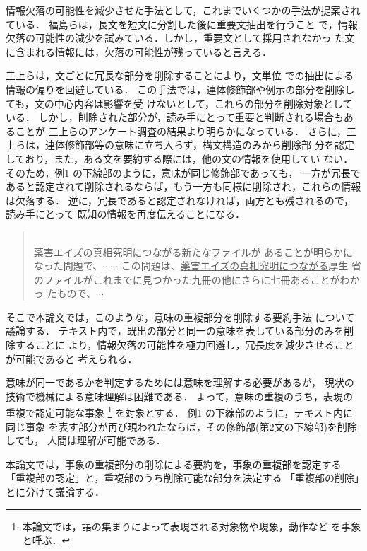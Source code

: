 情報欠落の可能性を減少させた手法として，これまでいくつかの手法が提案され
ている．
福島ら\cite{fukushima99}は，長文を短文に分割した後に重要文抽出を行うこと
で，情報欠落の可能性の減少を試みている．しかし，重要文として採用されなかっ
た文に含まれる情報には，欠落の可能性が残っていると言える．

三上ら\cite{mikami99}は，文ごとに冗長な部分を削除することにより，文単位
での抽出による情報の偏りを回避している．
この手法では，連体修飾部や例示の部分を削除しても，文の中心内容は影響を受
けないとして，これらの部分を削除対象としている．
しかし，削除された部分が，読み手にとって重要と判断される場合もあることが
三上らのアンケート調査の結果より明らかになっている．
さらに，三上らは，連体修飾部等の意味に立ち入らず，構文構造のみから削除部
分を認定しており，また，ある文を要約する際には，他の文の情報を使用してい
ない．
そのため，例1 の下線部のように，意味が同じ修飾部であっても，
一方が冗長で
あると認定されて削除されるならば，もう一方も同様に削除され，これらの情報
は欠落する．
逆に，冗長であると認定されなければ，両方とも残されるので，読み手にとって
既知の情報を再度伝えることになる．
\newpage
\begin{quote}\label{rei:rei1}
\hspace*{-1em}{\bf 例1：}\\
\hspace*{1em}\underline{薬害エイズの真相究明につながる}新たなファイルが
 あることが明らかになった問題で、$\cdots\cdots$
\hspace*{1em}この問題は、\underline{薬害エイズの真相究明につながる}厚生
 省のファイルがこれまでに見つかった九冊の他にさらに七冊あることがわかっ
 たもので、$\cdots$
\end{quote}
\vspace{4mm}

そこで本論文では，このような，意味の重複部分を削除する要約手法
について議論する．
テキスト内で，既出の部分と同一の意味を表している部分のみを削除することに
より，情報欠落の可能性を極力回避し，冗長度を減少させることが可能であると
考えられる．

意味が同一であるかを判定するためには意味を理解する必要があるが，
現状の技術で機械による意味理解は困難である．
よって，意味の重複のうち，表現の重複で認定可能な事象
\footnote{本論文では，語の集まりによって表現される対象物や現象，動作など
を事象と呼ぶ．}
を対象とする．
例1 の下線部のように，テキスト内に同じ事象
を表す部分が再び現われたならば，その修飾部(第2文の下線部)を削除しても，
人間は理解が可能である．

本論文では，事象の重複部分の削除による要約を，事象の重複部を認定する
「重複部の認定」と，重複部のうち削除可能な部分を決定する
「重複部の削除」とに分けて議論する．

